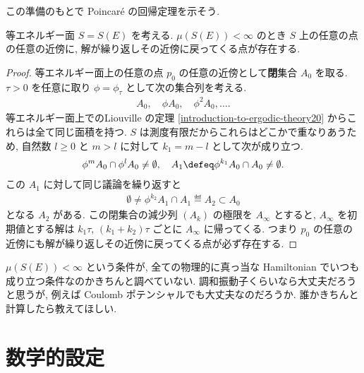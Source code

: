\documentclass[openany, a4paper, oneside]{jsbook}
\begin{document}
この準備のもとで Poincar\'e の回帰定理を示そう.
\begin{thm}
等エネルギー面 $S = S(E)$ を考える.
$\mu (S(E)) < \infty$ のとき
$S$ 上の任意の点の任意の近傍に, 解が繰り返しその近傍に戻ってくる点が存在する.
\end{thm}
\begin{proof}
等エネルギー面上の任意の点 $p_0$ の任意の近傍として\textbf{閉}集合 $A_0$ を取る.
$\tau > 0$ を任意に取り $\phi = \phi_{\tau}$ として次の集合列を考える.
\begin{align}
 A_0, \quad \phi A_0, \quad \phi^2 A_0, \dots.
\end{align}
等エネルギー面上でのLiouville の定理 \ref{introduction-to-ergodic-theory20} からこれらは全て同じ面積を持つ.
$S$ は測度有限だからこれらはどこかで重なりあうため,
自然数 $l \geq 0$ と $m > l$ に対して $k_1 = m - l$ として次が成り立つ.
\begin{align}
 \phi^m A_0 \cap \phi^l A_0
 \neq
 \emptyset, \quad
 A_1
 \defeq
 \phi^{k_1} A_0 \cap A_0
 \neq
 \emptyset.
\end{align}
この $A_1$ に対して同じ議論を繰り返すと
\begin{align}
 \emptyset
 \neq
 \phi^{k_2} A_1 \cap A_1
 \eqdef
 A_2
 \subset
 A_0
\end{align}
となる $A_2$ がある.
この閉集合の減少列 $(A_k)$ の極限を $A_{\infty}$ とすると,
$A_{\infty}$ を初期値とする解は $k_1 \tau$, $(k_1 + k_2) \tau$ ごとに $A_{\infty}$ に帰ってくる.
つまり $p_0$ の任意の近傍にも解が繰り返しその近傍に戻ってくる点が必ず存在する.
\end{proof}
\begin{rem}
$\mu (S(E)) < \infty$ という条件が, 全ての物理的に真っ当な
Hamiltonian でいつも成り立つ条件なのかきちんと調べていない.
調和振動子くらいなら大丈夫だろうと思うが, 例えば Coulomb ポテンシャルでも大丈夫なのだろうか.
誰かきちんと計算したら教えてほしい.
\end{rem}
\section{数学的設定}
\end{document}
